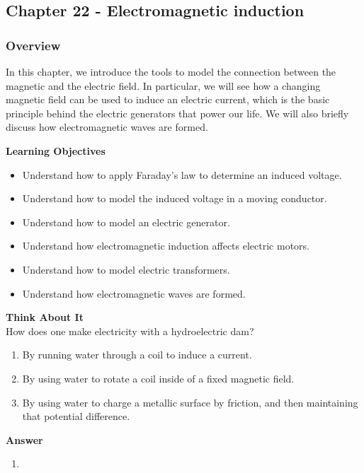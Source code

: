 \subsection{Chapter 22 - Electromagnetic induction}

\subsubsection{Overview}\label{chapter:induction}

In this chapter, we introduce the tools to model the connection between the magnetic and the electric field. In particular, we will see how a changing magnetic field can be used to induce an electric current, which is the basic principle behind the electric generators that power our life. We will also briefly discuss how electromagnetic waves are formed.

\begin{framed}
\textbf{Learning Objectives}\\
\begin{itemize}
\item Understand how to apply Faraday's law to determine an induced voltage.
\item Understand how to model the induced voltage in a moving conductor.
\item Understand how to model an electric generator.
\item Understand how electromagnetic induction affects electric motors.
\item Understand how to model electric transformers.
\item Understand how electromagnetic waves are formed.
\end{itemize}
\end{framed}

\begin{framed}
\textbf{Think About It}\\
How does one make electricity with a hydroelectric dam?

\begin{enumerate}
\item By running water through a coil to induce a current.
\item By using water to rotate a coil inside of a fixed magnetic field.
\item By using water to charge a metallic surface by friction, and then maintaining that potential difference.
\end{enumerate}

\begin{framed}
\textbf{Answer}\\
\begin{enumerate}[resume]
\item
\end{enumerate}
\end{framed}
\end{framed}

